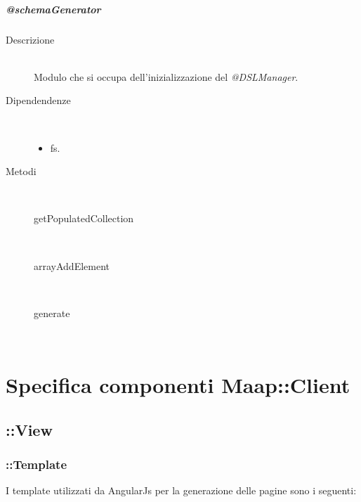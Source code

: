 \subparagraph{@schemaGenerator}
\begin{description}
 \item[Descrizione] \hfill \\
  Modulo che si occupa dell'inizializzazione del \textit{@DSLManager}.
 \item[Dipendendenze] \hfill \\
 \begin{itemize}
  \item{fs}.
 \end{itemize}
  
 \item[Metodi] \hfill \\
 \begin{description}
 \item[getPopulatedCollection] \hfill \\ 
 \item[arrayAddElement] \hfill \\ 
 \item[generate] \hfill \\ 
 \end{description}
 
\end{description}
\section{Specifica componenti Maap::Client}

\subsection{::View}

\subsubsection{::Template}
I template utilizzati da AngularJs per la generazione delle pagine sono i seguenti:

